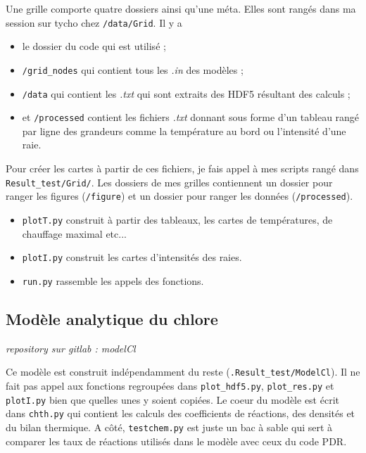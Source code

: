 \documentclass[11pt,a4paper,twoside,openright]{article}
\begin{document}
\begin{spacing}{0.98}
Une grille comporte quatre dossiers ainsi qu'une méta. Elles sont rangés dans ma session sur tycho chez \texttt{/data/Grid}. Il y a 
\begin{itemize}
    \item le dossier du code qui est utilisé ;
    \item \texttt{/grid\_nodes} qui contient tous les \textit{.in} des modèles ;
    \item \texttt{/data} qui contient les \textit{.txt} qui sont extraits des HDF5 résultant des calculs ;
    \item et \texttt{/processed} contient les fichiers \textit{.txt} donnant sous forme d'un tableau rangé par ligne des grandeurs comme la température au bord ou l'intensité d'une raie. 
\end{itemize}

Pour créer les cartes à partir de ces fichiers, je fais appel à mes scripts rangé dans \texttt{Result\_test/Grid/}. Les dossiers de mes grilles contiennent un dossier pour ranger les figures (\texttt{/figure}) et un dossier pour ranger les données (\texttt{/processed}).
\begin{itemize}
    \item \texttt{plotT.py} construit à partir des tableaux, les cartes de températures, de chauffage maximal etc... 
    \item \texttt{plotI.py} construit les cartes d'intensités des raies. 
    \item \texttt{run.py} rassemble les appels des fonctions. 
\end{itemize}

\subsection{Modèle analytique du chlore}

\textit{repository sur gitlab : modelCl} \newline

Ce modèle est construit indépendamment du reste (\texttt{.Result\_test/ModelCl}). Il ne fait pas appel aux fonctions regroupées dans \texttt{plot\_hdf5.py}, \texttt{plot\_res.py} et \texttt{plotI.py} bien que quelles unes y soient copiées. Le coeur du modèle est écrit dans \texttt{chth.py} qui contient les calculs des coefficients de réactions, des densités et du bilan thermique. A côté, \texttt{testchem.py} est juste un bac à sable qui sert à comparer les taux de réactions utilisés dans le modèle avec ceux du code PDR. \newline


\end{spacing}
\end{document}
